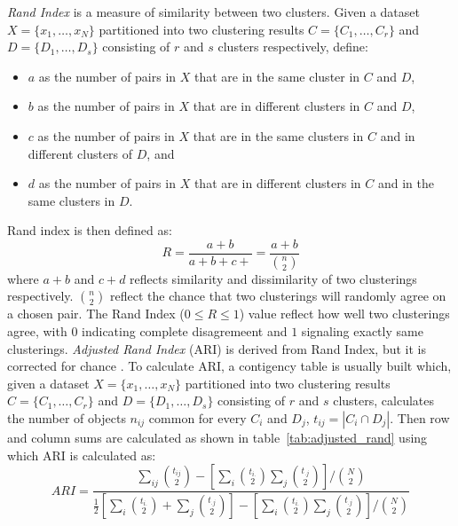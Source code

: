 \textit{Rand Index} is a measure of similarity between two clusters. \citep{santos2009use}
Given a dataset $X = \{x_1, \dots, x_N\}$ partitioned into two clustering results
$C = \{C_1, \dots, C_r\}$ and $D = \{D_1, \dots, D_s\}$ consisting of $r$ and $s$ clusters
respectively, define:
\begin{itemize}
\item $a$ as the number of pairs in $X$ that are in the same cluster in $C$ and $D$,
\item $b$ as the number of pairs in $X$ that are in different clusters in $C$ and $D$,
\item $c$ as the number of pairs in $X$ that are in the same clusters in $C$ and in different clusters of $D$, and
\item $d$ as the number of pairs in $X$ that are in different clusters in $C$ and in the same clusters in $D$. 
\end{itemize}
Rand index is then defined as:
\begin{equation}\label{eq:rand_index}
	R = \frac{a + b}{a + b + c + } = \frac{a + b}{\binom{n}{2}}
\end{equation}
where $a + b$ and $c + d$ reflects similarity and dissimilarity of two clusterings respectively.  
$\binom{n}{2}$ reflect the chance that two clusterings will randomly agree on a chosen pair. 
The Rand Index ($0 \leq R \leq 1$) value reflect how well two clusterings agree, with 
$0$ indicating complete disagremeent and $1$ signaling exactly same clusterings. 
\textit{Adjusted Rand Index} (ARI) is derived from Rand Index, but it is corrected for chance
\citep{steinley2004properties}. To calculate ARI, a contigency table is usually built which, 
given a dataset $X = \{x_1, \dots, x_N\}$ partitioned into two clustering
results $C = \{C_1, \dots, C_r\}$ and $D = \{D_1, \dots, D_s\}$ consisting of
$r$ and $s$ clusters, calculates the number of objects $n_{ij}$ common for every
$C_i$ and $D_j$, $t_{ij} = |C_i \cap D_j|$. Then row and column sums are calculated 
as shown in table~\ref{tab:adjusted_rand} using which ARI is calculated as:
\begin{equation}\label{eq:adjusted_rand_index}
	ARI = \frac{\sum_{ij} \binom{t_{ij}}{2}- \left[ \sum_i \binom{t_{i.}}{2} \sum_j \binom{t_{.j}}{2} \right] / \binom{N}{2}}
	{\frac{1}{2} \left[ \sum_i \binom{t_{i.}}{2} + \sum_j \binom{t_{.j}}{2} \right] - 
	\left[ \sum_i \binom{t_{i.}}{2} \sum_j \binom{t_{.j}}{2} \right] / \binom{N}{2}
	}
\end{equation}

